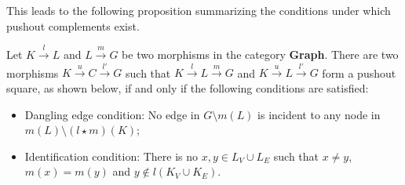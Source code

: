 This leads to the following proposition summarizing the conditions under which pushout complements exist.
\begin{proposition} 
    \label{prop:existence_of_pushout_complement}
    Let $K \overset{l}{\rightarrow} L$ and $L \overset{m}{\rightarrow} G$ be two morphisms in the category \textbf{Graph}. There are two morphisms $K \overset{u}{\rightarrow} C \overset{l'}{\rightarrow} G$ such that $K \overset{l}{\rightarrow} L \overset{m}{\rightarrow} G$ and $K \overset{u}{\rightarrow} L \overset{l'}{\rightarrow} G$ form a pushout square, as shown 
    below, 
    if and only if the following conditions are satisfied:
    \begin{itemize} 
        \item{Dangling edge condition:} 
        No edge in \(G\mathop{\setminus} m(L)\) is incident to any node in \(m(L) \mathop{\setminus} (l \mathop{\star} m)(K)\);
        \item{Identification condition: } There is no $x,y \mathop{\in} L_V \mathop{\cup} L_E$ such that $x \mathop{\neq} y$, $m(x) \mathop{=} m(y)$ and $y \notin l(K_V \mathop{\cup} K_E)$.
    \end{itemize} 
    \begin{center}
        \end{center}
\end{proposition}
 

